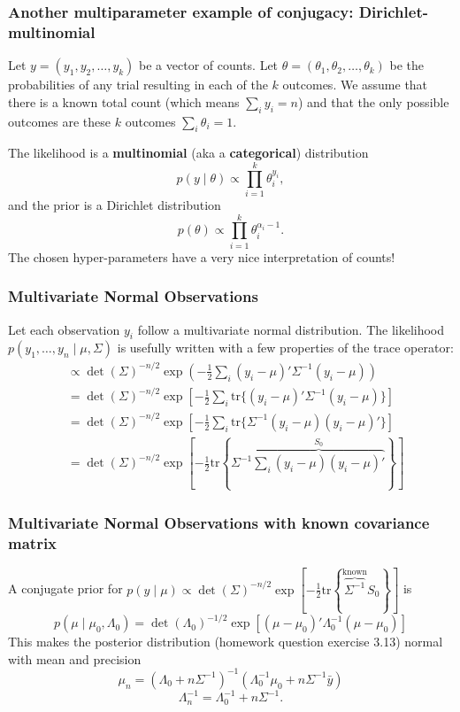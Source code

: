 \documentclass{beamer}
\begin{document}
\begin{frame}[fragile]
\frametitle{Another multiparameter example of conjugacy: Dirichlet-multinomial}

Let $y = (y_1, y_2, \ldots, y_k)$ be a vector of counts. Let $\theta = (\theta_1, \theta_2, \ldots, \theta_k)$ be the probabilities of any trial resulting in each of the $k$ outcomes. We assume that there is a known total count (which means $\sum_i y_i = n$) and that the only possible outcomes are these $k$ outcomes $\sum_i \theta_i = 1$.
\newline

The likelihood is a {\bf multinomial} (aka a {\bf categorical}) distribution
$$
p(y \mid \theta) \propto \prod_{i=1}^k \theta_i^{y_i},
$$
and the prior is a Dirichlet distribution
$$
p(\theta) \propto \prod_{i=1}^k \theta_i^{\alpha_i - 1}.
$$
The chosen hyper-parameters have a very nice interpretation of counts!
\end{frame}

\begin{frame}[fragile]
\frametitle{Multivariate Normal Observations}

Let each observation $y_i$ follow a multivariate normal distribution. The likelihood $p(y_1, \ldots, y_n \mid \mu, \Sigma)$ is usefully written with a few properties of the trace operator:
\begin{align*}
&\propto \det(\Sigma)^{-n/2} \exp\left(-\frac{1}{2}\sum_i (y_i - \mu)'\Sigma^{-1}(y_i- \mu) \right) \\
&= \det(\Sigma)^{-n/2} \exp\left[-\frac{1}{2}\sum_i \text{tr}\{ (y_i - \mu)'\Sigma^{-1}(y_i- \mu) \} \right] \\
&= \det(\Sigma)^{-n/2} \exp\left[-\frac{1}{2}\sum_i \text{tr}\{ \Sigma^{-1}(y_i- \mu)(y_i - \mu)' \} \right] \\
&= \det(\Sigma)^{-n/2} \exp\left[-\frac{1}{2} \text{tr}\left\{\Sigma^{-1} \overbrace{\sum_i  (y_i- \mu)(y_i - \mu)'}^{S_0} \right\} \right]
\end{align*}

\end{frame}

\begin{frame}[fragile]
\frametitle{Multivariate Normal Observations with known covariance matrix}

A conjugate prior for $p(y \mid \mu) \propto \det(\Sigma)^{-n/2} \exp\left[-\frac{1}{2} \text{tr}\left\{\overbrace{\Sigma^{-1}}^{ \text{known} } S_0 \right\} \right]$ is
$$
p(\mu \mid \mu_0, \Lambda_0) = \det(\Lambda_0)^{-1/2} \exp\left[(\mu - \mu_0)'\Lambda_0^{-1}(\mu - \mu_0) \right]
$$
This makes the posterior distribution (homework question exercise 3.13) normal with mean and precision
\[
\mu_n  = (\Lambda_0 + n \Sigma^{-1})^{-1}(\Lambda_0^{-1} \mu_0 + n \Sigma^{-1} \bar{y})
\]
\[
\Lambda_n^{-1} = \Lambda_0^{-1} + n \Sigma^{-1}.
\]
\end{frame}
\end{document}
